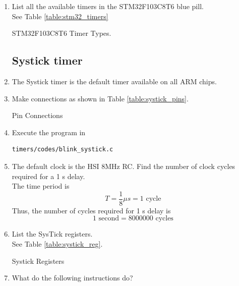 \begin{enumerate}[label=\arabic*.,ref=\theenumi]
\item List all the available timers in the STM32F103C8T6 blue pill.
\\
\solution  See Table \ref{table:stm32_timers}
\begin{table}[!ht]
\centering
\footnotesize

\caption{STM32F103C8T6 Timer Types.}
\label{table:stm32_timers}
\end{table}

\subsection{Systick timer}
\item The Systick timer is the default timer available on all ARM chips. 
\item Make connections as shown in Table \ref{table:systick_pins}.
\begin{table}[!ht]
\centering
\footnotesize

\caption{Pin Connections}
\label{table:systick_pins}
\end{table}
\item Execute the program in 
\begin{lstlisting}
timers/codes/blink_systick.c
\end{lstlisting}
\item The default clock is the HSI 8MHz RC.  Find the number of clock cycles required for a 1 s delay.
\\
\solution The time period is
\begin{equation}
T = \frac{1}{8}\mu s = 1 \text{ cycle}
\end{equation}
Thus, the number of cycles required for 1 s delay is
\begin{equation}
1 \text{ second} = 8000000 \text{ cycles}
\end{equation}
\item List the SysTick registers.
\\
\solution See Table \ref{table:systick_reg}.
\begin{table}[!ht]
\footnotesize
\centering

\caption{Systick Registers}
\label{table:systick_reg}
\end{table}
\item What do the following instructions do?

\end{enumerate}
